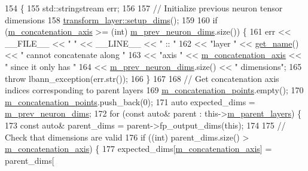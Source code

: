 \begin{DoxyCode}
154                              \{
155     std::stringstream err;
156 
157     \textcolor{comment}{// Initialize previous neuron tensor dimensions}
158     \hyperlink{classlbann_1_1Layer_a90fce1b06c1f2abb480e18cfe08a9746}{transform\_layer::setup\_dims}();
159 
160     \textcolor{keywordflow}{if} (\hyperlink{classlbann_1_1concatenation__layer_a4ac4a931dc85d622e9ea8fddb9625d38}{m\_concatenation\_axis} >= (\textcolor{keywordtype}{int}) \hyperlink{classlbann_1_1Layer_ae204d1a2a79606eaa117273857ff62a3}{m\_prev\_neuron\_dims}.size()) \{
161       err << \_\_FILE\_\_ << \textcolor{stringliteral}{" "} << \_\_LINE\_\_ << \textcolor{stringliteral}{" :: "}
162           << \textcolor{stringliteral}{"layer "} << \hyperlink{classlbann_1_1Layer_a80027550202fa7dbb1dd55fa8a66c84b}{get\_name}() << \textcolor{stringliteral}{" cannot concatenate along "}
163           << \textcolor{stringliteral}{"axis "} << \hyperlink{classlbann_1_1concatenation__layer_a4ac4a931dc85d622e9ea8fddb9625d38}{m\_concatenation\_axis} << \textcolor{stringliteral}{" since it only has "}
164           << \hyperlink{classlbann_1_1Layer_ae204d1a2a79606eaa117273857ff62a3}{m\_prev\_neuron\_dims}.size() << \textcolor{stringliteral}{" dimensions"};
165       \textcolor{keywordflow}{throw} lbann\_exception(err.str());
166     \}
167 
168     \textcolor{comment}{// Get concatenation axis indices corresponding to parent layers}
169     \hyperlink{classlbann_1_1concatenation__layer_a363324fe6cd104740334f3396085328c}{m\_concatenation\_points}.empty();
170     \hyperlink{classlbann_1_1concatenation__layer_a363324fe6cd104740334f3396085328c}{m\_concatenation\_points}.push\_back(0);
171     \textcolor{keyword}{auto} expected\_dims = \hyperlink{classlbann_1_1Layer_ae204d1a2a79606eaa117273857ff62a3}{m\_prev\_neuron\_dims};
172     \textcolor{keywordflow}{for} (\textcolor{keyword}{const} \textcolor{keyword}{auto}& parent : this->\hyperlink{classlbann_1_1Layer_a3fa7c6cf1a22bb14ab0e85e3dc6027c5}{m\_parent\_layers}) \{
173       \textcolor{keyword}{const} \textcolor{keyword}{auto}& parent\_dims = parent->fp\_output\_dims(\textcolor{keyword}{this});
174 
175       \textcolor{comment}{// Check that dimensions are valid}
176       \textcolor{keywordflow}{if} ((\textcolor{keywordtype}{int}) parent\_dims.size() > \hyperlink{classlbann_1_1concatenation__layer_a4ac4a931dc85d622e9ea8fddb9625d38}{m\_concatenation\_axis}) \{
177         expected\_dims[\hyperlink{classlbann_1_1concatenation__layer_a4ac4a931dc85d622e9ea8fddb9625d38}{m\_concatenation\_axis}] = parent\_dims[

\end{DoxyCode}
